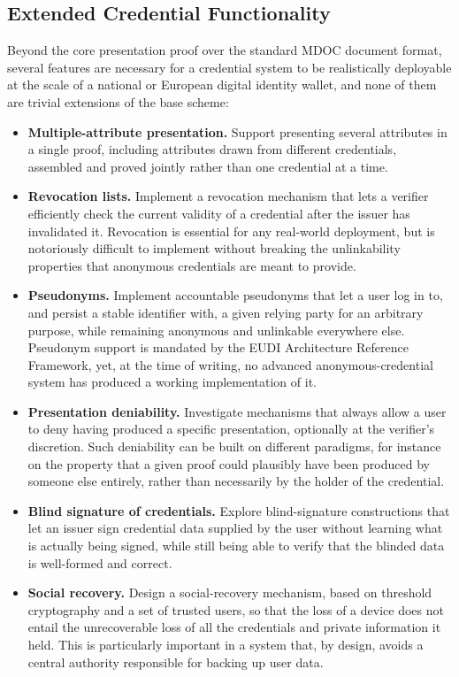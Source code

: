 \documentclass{article}
\begin{document}
\subsection{Extended Credential Functionality}

Beyond the core presentation proof over the standard MDOC document format, several features are necessary for a credential system to be realistically deployable at the scale of a national or European digital identity wallet, and none of them are trivial extensions of the base scheme:

\begin{itemize}
    \item \textbf{Multiple-attribute presentation.} Support presenting several attributes in a single proof, including attributes drawn from different credentials, assembled and proved jointly rather than one credential at a time.
    \item \textbf{Revocation lists.} Implement a revocation mechanism that lets a verifier efficiently check the current validity of a credential after the issuer has invalidated it. Revocation is essential for any real-world deployment, but is notoriously difficult to implement without breaking the unlinkability properties that anonymous credentials are meant to provide.
    \item \textbf{Pseudonyms.} Implement accountable pseudonyms that let a user log in to, and persist a stable identifier with, a given relying party for an arbitrary purpose, while remaining anonymous and unlinkable everywhere else. Pseudonym support is mandated by the EUDI Architecture Reference Framework, yet, at the time of writing, no advanced anonymous-credential system has produced a working implementation of it.
    \item \textbf{Presentation deniability.} Investigate mechanisms that always allow a user to deny having produced a specific presentation, optionally at the verifier's discretion. Such deniability can be built on different paradigms, for instance on the property that a given proof could plausibly have been produced by someone else entirely, rather than necessarily by the holder of the credential.
    \item \textbf{Blind signature of credentials.} Explore blind-signature constructions that let an issuer sign credential data supplied by the user without learning what is actually being signed, while still being able to verify that the blinded data is well-formed and correct.
    \item \textbf{Social recovery.} Design a social-recovery mechanism, based on threshold cryptography and a set of trusted users, so that the loss of a device does not entail the unrecoverable loss of all the credentials and private information it held. This is particularly important in a system that, by design, avoids a central authority responsible for backing up user data.
\end{itemize}
\end{document}
